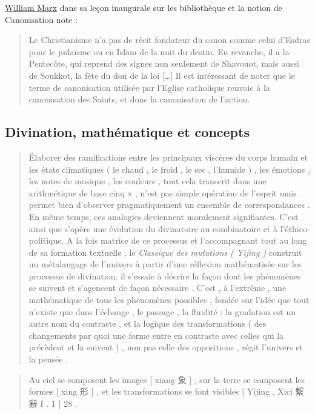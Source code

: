 \href{https://fr.wikipedia.org/wiki/William_Marx}{William Marx} dans sa leçon inaugurale sur les bibliothèque et la notion de Canonisation note : 
\begin{quote}
    Le Christianisme n'a pas de récit fondateur du canon comme celui d'Esdras pour le judaïsme ou en Islam de la nuit du destin. En revanche, il a la Pentecôte, qui reprend des signes non seulement de Shavouot, mais aussi de Soukkot, la fête du don de la loi [\ldots]
    Il est intéressant de noter que le terme de canonisation utilisée par l'Eglise catholique renvoie à la canonisation des Saints, et donc la canonisation de l'action.
\end{quote}
\subsection{Divination, mathématique et concepts}
 \begin{quote}  

Élaborer des ramifications entre les principaux viscères du corps humain
et les états climatiques ( le chaud , le froid , le sec , l'humide ) ,
les émotions , les notes de musique , les couleurs , tout cela transcrit
dans une arithmétique de
base cinq » , n'est pas simple opération de l'esprit mais permet bien
d'observer pragmatiquement un ensemble de correspondances . En même temps, ces analogies deviennent moralement signifiantes. C’est ainsi que s’opère une évolution du divinatoire au combinatoire et à l’éthico-politique.   
A la fois matrice de ce processus et l'accompagnant tout au long de sa
formation textuelle , le \textit{Classique des mutations ( Yijing )} construit un
métalangage de l'univers à partir d'une réflexion mathématisée sur les
processus de divination.
il s'essaie à décrire la façon dont les phénomènes se suivent et
s'agencent de façon nécessaire . C'est , à l'extrême , une mathématique
de tous les phénomènes possibles , fondée sur l'idée que tout n'existe
que dans l'échange , le passage , la fluidité : la gradation est un
autre nom du contraste , et la logique des transformations ( des
changements par quoi une forme entre en contraste avec celles qui la
précèdent et la suivent ) , non pas celle des oppositions , régit
l'univers et la pensée .

\end{quote}  \begin{quote}

Au ciel se composent les images {[} xiang {象} {]} , sur la terre se
composent les formes {[} xing 形 {]} , et les transformations se font
visibles {[} Yijing , Xici 繫辭 I . 1 {]} 28 .

\end{quote} 

